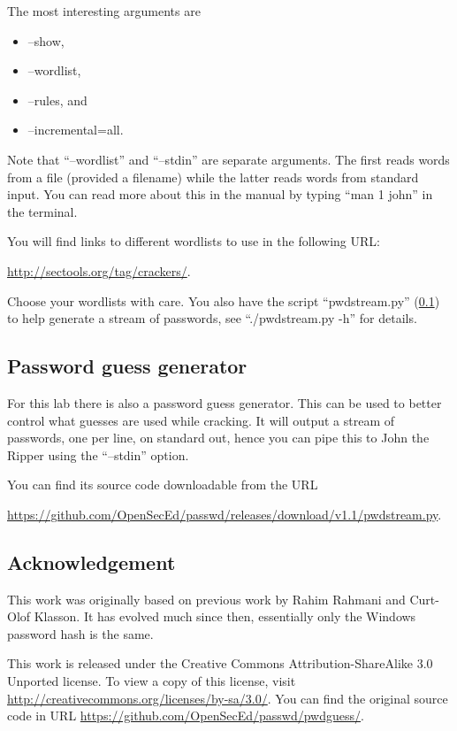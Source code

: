 The most interesting arguments are
\begin{itemize}
  \item --show,
  \item --wordlist,
  \item --rules, and
  \item --incremental=all.
\end{itemize}
Note that \enquote{--wordlist} and \enquote{--stdin} are separate arguments.
The first reads words from a file (provided a filename) while the latter reads 
words from standard input.
You can read more about this in the manual by typing \enquote{man 1 john} in 
the terminal.

You will find links to different wordlists to use in the following URL\@:
\begin{center}
  \url{http://sectools.org/tag/crackers/}.
\end{center}
Choose your wordlists with care.
You also have the script \enquote{pwdstream.py} (\cref{pwdstream}) to help 
generate a stream of passwords, see \enquote{./pwdstream.py -h} for details.


\subsection{Password guess generator}%
\label{pwdstream}

For this lab there is also a password guess generator.
This can be used to better control what guesses are used while cracking.
It will output a stream of passwords, one per line, on standard out, hence you 
can pipe this to John the Ripper using the \enquote{--stdin} option.

You can find its source code downloadable from the URL
\begin{center}
\url{https://github.com/OpenSecEd/passwd/releases/download/v1.1/pwdstream.py}.
\end{center}

%


\subsection*{Acknowledgement}

This work was originally based on previous work by Rahim Rahmani and Curt-Olof 
Klasson.
It has evolved much since then, essentially only the Windows password hash is 
the same.

This work is released under the Creative Commons Attribution-ShareAlike 3.0 
Unported license.
To view a copy of this license, visit 
\url{http://creativecommons.org/licenses/by-sa/3.0/}.
You can find the original source code in URL 
\url{https://github.com/OpenSecEd/passwd/pwdguess/}.



